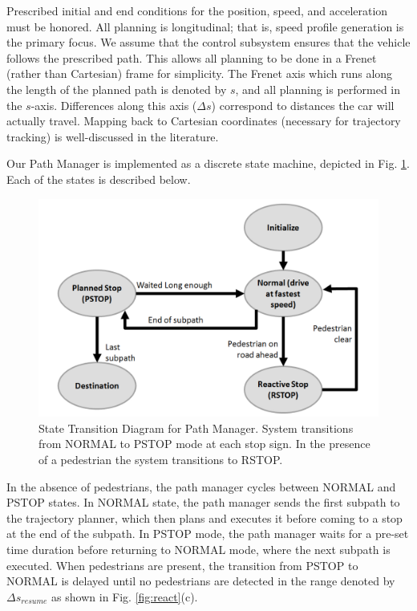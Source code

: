 \documentclass[letterpaper, 10 pt, conference]{ieeeconf}  %
\begin{document}
Prescribed initial and end conditions for the position, speed, and acceleration must be honored.
All planning is longitudinal; that is, speed profile generation is the primary focus. We assume that the control subsystem ensures that the vehicle follows the prescribed path.
This allows all planning to be done in a Frenet (rather than Cartesian) frame for simplicity.
The Frenet axis which runs along the length of the planned path is denoted by $s$, and all planning is performed in the $s$-axis.
Differences along this axis ($\Delta s$) correspond to distances the car will actually travel.
Mapping back to Cartesian coordinates (necessary for trajectory tracking) is well-discussed in the literature.

Our Path Manager is implemented as a discrete state machine, depicted in Fig. \ref{fig:st}.
Each of the states is described below.

\begin{figure}[tb]
  \centering
  \includegraphics[width=0.9\columnwidth]{graphics/state_transition.PNG}
  \caption{State Transition Diagram for Path Manager. System transitions from NORMAL to PSTOP mode at each stop sign. In the presence of a pedestrian the system transitions to RSTOP.}
  \label{fig:st}
\end{figure}

In the absence of pedestrians, the path manager cycles between NORMAL and PSTOP states.
In NORMAL state, the path manager sends the first subpath to the trajectory planner, which then plans and executes it before coming to a stop at the end of the subpath.
In PSTOP mode, the path manager waits for a pre-set time duration before returning to NORMAL mode, where the next subpath is executed.
When pedestrians are present, the transition from PSTOP to NORMAL is delayed until no pedestrians are detected in the range denoted by $\Delta s_{resume}$ as shown in Fig. \ref{fig:react}(c).
\end{document}
